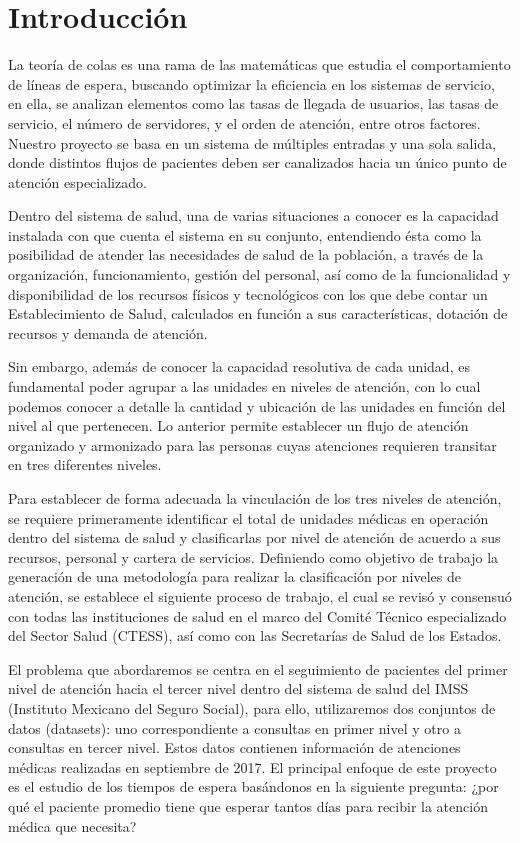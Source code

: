 \documentclass[10pt]{article}
\begin{document}
	\section{Introducción}
	La teoría de colas es una rama de las matemáticas que estudia el comportamiento de líneas de espera, buscando optimizar la eficiencia en los sistemas de servicio, en ella, se analizan elementos como las tasas de llegada de usuarios, las tasas de servicio, el número de servidores, y el orden de atención, entre otros factores. Nuestro proyecto se basa en un sistema de múltiples entradas y una sola salida, donde distintos flujos de pacientes deben ser canalizados hacia un único punto de atención especializado. \par
    Dentro del sistema de salud, una de varias situaciones a conocer es la capacidad instalada con que cuenta el sistema en su conjunto, entendiendo ésta como la posibilidad de atender las necesidades de salud de la población, a través de la organización, funcionamiento, gestión del personal, así como de la funcionalidad y disponibilidad de los recursos físicos y tecnológicos con los que debe contar un Establecimiento de Salud, calculados en función a sus características, dotación de recursos y demanda de atención. \par
    Sin embargo, además de conocer la capacidad resolutiva de cada unidad, es fundamental poder agrupar a las unidades en niveles de atención, con lo cual podemos conocer a detalle la cantidad y ubicación de las unidades en función del nivel al que pertenecen. Lo anterior permite establecer un flujo de atención organizado y armonizado para las personas cuyas atenciones requieren transitar en tres diferentes niveles. \par
    Para establecer de forma adecuada la vinculación de los tres niveles de atención, se requiere primeramente identificar el total de unidades médicas en operación dentro del sistema de salud y clasificarlas por nivel de atención de acuerdo a sus recursos, personal y cartera de servicios. Definiendo como objetivo de trabajo la generación de una metodología para realizar la clasificación por niveles de atención, se establece el siguiente proceso de trabajo, el cual se revisó y consensuó con todas las instituciones de salud en el marco del Comité Técnico especializado del Sector Salud (CTESS), así como con las Secretarías de Salud de los Estados. \par
    El problema que abordaremos se centra en el seguimiento de pacientes del primer nivel de atención hacia el tercer nivel dentro del sistema de salud del IMSS (Instituto Mexicano del Seguro Social), para ello, utilizaremos dos conjuntos de datos (datasets): uno correspondiente a consultas en primer nivel y otro a consultas en tercer nivel. Estos datos contienen información de atenciones médicas realizadas en septiembre de 2017. El principal enfoque de este proyecto es el estudio de los tiempos de espera basándonos en la siguiente pregunta: ¿por qué el paciente promedio tiene que esperar tantos días para recibir la atención médica que necesita?
\end{document}
